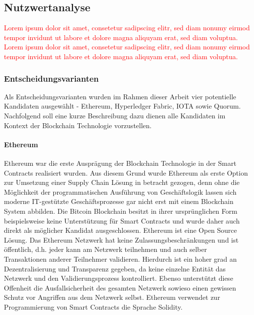 \subsection{Nutzwertanalyse}
\textcolor{red}{Lorem ipsum dolor sit amet, consetetur sadipscing elitr, sed diam nonumy eirmod tempor invidunt ut labore et dolore magna aliquyam erat, sed diam voluptua. Lorem ipsum dolor sit amet, consetetur sadipscing elitr, sed diam nonumy eirmod tempor invidunt ut labore et dolore magna aliquyam erat, sed diam voluptua.}

\subsubsection{Entscheidungsvarianten}
Als Entscheidungsvarianten wurden im Rahmen dieser Arbeit vier potentielle Kandidaten ausgewählt - Ethereum, Hyperledger Fabric, IOTA sowie Quorum. Nachfolgend soll eine kurze Beschreibung dazu dienen alle Kandidaten im Kontext der Blockchain Technologie vorzustellen.

\paragraph{Ethereum}
Ethereum war die erste Ausprägung der Blockchain Technologie in der Smart Contracts realisiert wurden. Aus diesem Grund wurde Ethereum als erste Option zur Umsetzung einer Supply Chain Lösung in betracht gezogen, denn ohne die Möglichkeit der programmatischen Ausführung von Geschäftslogik lassen sich moderne IT-gestützte Geschäftsprozesse gar nicht erst mit einem Blockchain System abbilden. Die Bitcoin Blockchain besitzt in ihrer ursprünglichen Form beispielsweise keine Unterstützung für Smart Contracts und wurde daher auch direkt als möglicher Kandidat ausgeschlossen. Ethereum ist eine Open Source Lösung. Das Ethereum Netzwerk hat keine Zulassungsbeschränkungen und ist öffentlich, d.h. jeder kann am Netzwerk teilnehmen und auch selber Transaktionen anderer Teilnehmer validieren. Hierdurch ist ein hoher grad an Dezentralisierung und Transparenz gegeben, da keine einzelne Entität das Netzwerk und den Validierungsprozess kontrolliert. Ebenso unterstützt diese Offenheit die Ausfallsicherheit des gesamten Netzwerk sowieso einen gewissen Schutz vor Angriffen aus dem Netzwerk selbst. Ethereum verwendet zur Programmierung von Smart Contracts die Sprache Solidity.


